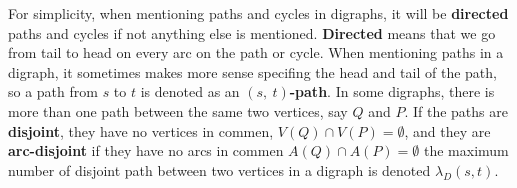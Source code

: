 For simplicity, when mentioning paths and cycles in digraphs, it will be \textbf{directed} paths and cycles if not anything else is mentioned. 
\textbf{Directed} means that we go from tail to head on every arc on the path or cycle.
When mentioning paths in a digraph, it sometimes makes more sense specifing the head and tail of the path, so a path from $s$ to $t$ is denoted as an \textbf{$(s,\ t)$-path}.
In some digraphs, there is more than one path between the same two vertices, say $Q$ and $P$.
If the paths are \textbf{disjoint}, they have no vertices in commen, $V(Q)\cap V(P)=\emptyset$, and they are \textbf{arc-disjoint} if they have no arcs in commen $A(Q)\cap A(P)=\emptyset$ the maximum number of disjoint path between two vertices in a digraph is denoted $\lambda_D(s,t)$.
 



